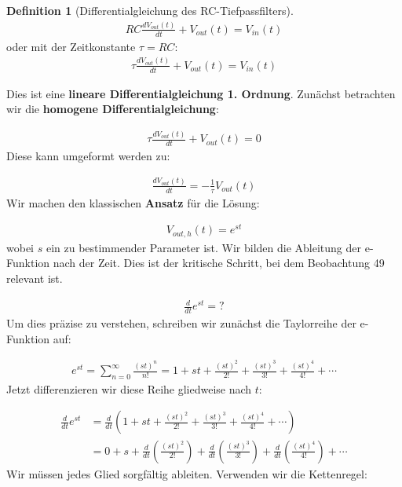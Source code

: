 \documentclass[a4paper, 12pt, twoside, openright]{report}
\theoremstyle{definition}
\newtheorem{definition}[theorem]{Definition}
\theoremstyle{definition}
\begin{document}
\begin{definition}[Differentialgleichung des RC-Tiefpassfilters]
	\begin{align}
		RC \frac{dV_{out}(t)}{dt} + V_{out}(t) = V_{in}(t)
	\end{align}
	oder mit der Zeitkonstante $\tau = RC$:
	\begin{align}
		\tau \frac{dV_{out}(t)}{dt} + V_{out}(t) = V_{in}(t)
	\end{align}
\end{definition}
Dies ist eine \textbf{lineare Differentialgleichung 1. Ordnung}. Zunächst betrachten wir die \textbf{homogene Differentialgleichung}:

\begin{align}
	\tau \frac{dV_{out}(t)}{dt} + V_{out}(t) = 0
\end{align}
Diese kann umgeformt werden zu:

\begin{align}
	\frac{dV_{out}(t)}{dt} = -\frac{1}{\tau} V_{out}(t)
\end{align}
Wir machen den klassischen \textbf{Ansatz} für die Lösung:

\begin{align}
	V_{out,h}(t) = e^{st}
\end{align}
wobei $s$ ein zu bestimmender Parameter ist. Wir bilden die Ableitung der e-Funktion nach der Zeit. Dies ist der kritische Schritt, bei dem Beobachtung 49 relevant ist.

\begin{align}
	\frac{d}{dt} e^{st} = ?
\end{align}
Um dies präzise zu verstehen, schreiben wir zunächst die Taylorreihe der e-Funktion auf:

\begin{align}
	e^{st} = \sum_{n=0}^{\infty} \frac{(st)^n}{n!} = 1 + st + \frac{(st)^2}{2!} + \frac{(st)^3}{3!} + \frac{(st)^4}{4!} + \cdots
\end{align}
Jetzt differenzieren wir diese Reihe gliedweise nach $t$:

\begin{align}
	\frac{d}{dt} e^{st} &= \frac{d}{dt} \left( 1 + st + \frac{(st)^2}{2!} + \frac{(st)^3}{3!} + \frac{(st)^4}{4!} + \cdots \right)\\
	&= 0 + s + \frac{d}{dt}\left(\frac{(st)^2}{2!}\right) + \frac{d}{dt}\left(\frac{(st)^3}{3!}\right) + \frac{d}{dt}\left(\frac{(st)^4}{4!}\right) + \cdots
\end{align}
Wir müssen jedes Glied sorgfältig ableiten. Verwenden wir die Kettenregel:
\end{document}
